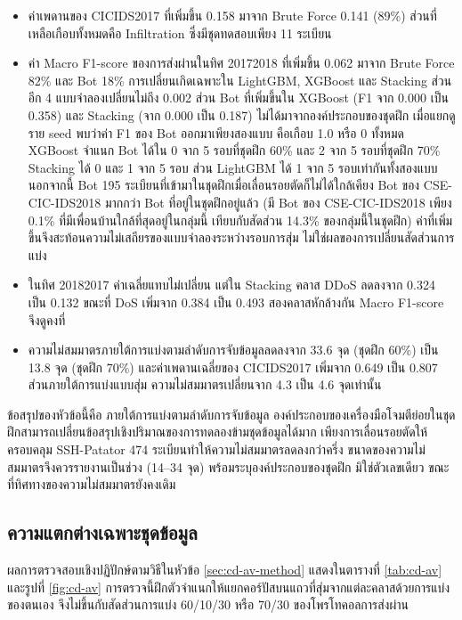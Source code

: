 \begin{itemize}
    \item ค่าเพดานของ CICIDS2017 ที่เพิ่มขึ้น 0.158 มาจาก Brute Force 0.141 (89\%) ส่วนที่เหลือเกือบทั้งหมดคือ Infiltration ซึ่งมีชุดทดสอบเพียง 11 ระเบียน
    \item ค่า Macro F1-score ของการส่งผ่านในทิศ 2017\dirarrow{}2018 ที่เพิ่มขึ้น 0.062 มาจาก Brute Force 82\% และ Bot 18\% การเปลี่ยนเกิดเฉพาะใน LightGBM, XGBoost และ Stacking ส่วนอีก 4 แบบจำลองเปลี่ยนไม่ถึง 0.002 ส่วน Bot ที่เพิ่มขึ้นใน XGBoost (F1 จาก 0.000 เป็น 0.358) และ Stacking (จาก 0.000 เป็น 0.187) ไม่ได้มาจากองค์ประกอบของชุดฝึก เมื่อแยกดูราย seed พบว่าค่า F1 ของ Bot ออกมาเพียงสองแบบ คือเกือบ 1.0 หรือ 0 ทั้งหมด XGBoost จำแนก Bot ได้ใน 0 จาก 5 รอบที่ชุดฝึก 60\% และ 2 จาก 5 รอบที่ชุดฝึก 70\% Stacking ได้ 0 และ 1 จาก 5 รอบ ส่วน LightGBM ได้ 1 จาก 5 รอบเท่ากันทั้งสองแบบ นอกจากนี้ Bot 195 ระเบียนที่เข้ามาในชุดฝึกเมื่อเลื่อนรอยตัดก็ไม่ได้ใกล้เคียง Bot ของ CSE-CIC-IDS2018 มากกว่า Bot ที่อยู่ในชุดฝึกอยู่แล้ว (มี Bot ของ CSE-CIC-IDS2018 เพียง 0.1\% ที่มีเพื่อนบ้านใกล้ที่สุดอยู่ในกลุ่มนี้ เทียบกับสัดส่วน 14.3\% ของกลุ่มนี้ในชุดฝึก) ค่าที่เพิ่มขึ้นจึงสะท้อนความไม่เสถียรของแบบจำลองระหว่างรอบการสุ่ม ไม่ใช่ผลของการเปลี่ยนสัดส่วนการแบ่ง
    \item ในทิศ 2018\dirarrow{}2017 ค่าเฉลี่ยแทบไม่เปลี่ยน แต่ใน Stacking คลาส DDoS ลดลงจาก 0.324 เป็น 0.132 ขณะที่ DoS เพิ่มจาก 0.384 เป็น 0.493 สองคลาสหักล้างกัน Macro F1-score จึงดูคงที่
    \item ความไม่สมมาตรภายใต้การแบ่งตามลำดับการจับข้อมูลลดลงจาก 33.6 จุด (ชุดฝึก 60\%) เป็น 13.8 จุด (ชุดฝึก 70\%) และค่าเพดานเฉลี่ยของ CICIDS2017 เพิ่มจาก 0.649 เป็น 0.807 ส่วนภายใต้การแบ่งแบบสุ่ม ความไม่สมมาตรเปลี่ยนจาก 4.3 เป็น 4.6 จุดเท่านั้น
\end{itemize}

ข้อสรุปของหัวข้อนี้คือ ภายใต้การแบ่งตามลำดับการจับข้อมูล องค์ประกอบของเครื่องมือโจมตีย่อยในชุดฝึกสามารถเปลี่ยนข้อสรุปเชิงปริมาณของการทดลองข้ามชุดข้อมูลได้มาก เพียงการเลื่อนรอยตัดให้ครอบคลุม SSH-Patator 474 ระเบียนทำให้ความไม่สมมาตรลดลงกว่าครึ่ง ขนาดของความไม่สมมาตรจึงควรรายงานเป็นช่วง (14--34 จุด) พร้อมระบุองค์ประกอบของชุดฝึก มิใช่ตัวเลขเดียว ขณะที่ทิศทางของความไม่สมมาตรยังคงเดิม

\subsection{ความแตกต่างเฉพาะชุดข้อมูล}
\label{sec:cd-av}

ผลการตรวจสอบเชิงปฏิปักษ์ตามวิธีในหัวข้อ \ref{sec:cd-av-method} แสดงในตารางที่ \ref{tab:cd-av} และรูปที่ \ref{fig:cd-av} การตรวจนี้ฝึกตัวจำแนกให้แยกคอร์ปัสบนแถวที่สุ่มจากแต่ละคลาสด้วยการแบ่งของตนเอง จึงไม่ขึ้นกับสัดส่วนการแบ่ง 60/10/30 หรือ 70/30 ของโพรโทคอลการส่งผ่าน

